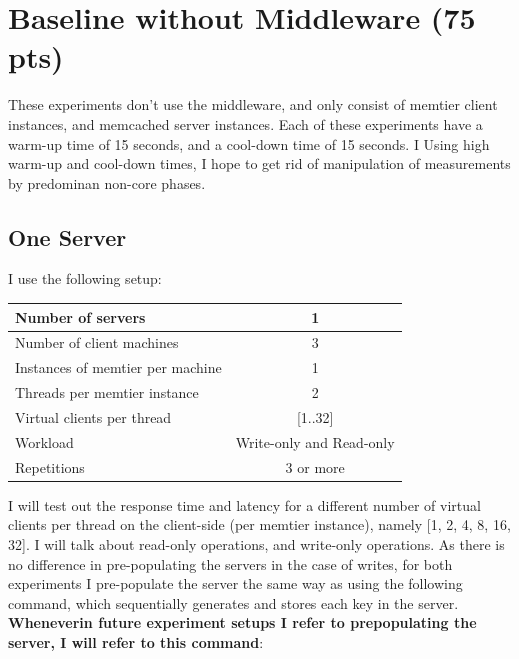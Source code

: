 \documentclass[11pt,a4paper]{article}
\begin{document}
\newpage

\section{Baseline without Middleware (75 pts)}
These experiments don't use the middleware, and only consist of memtier client instances, and memcached server instances.
Each of these experiments have a warm-up time of 15 seconds, and a cool-down time of 15 seconds.
I Using high warm-up and cool-down times, I hope to get rid of manipulation of measurements by predominan non-core phases.

\subsection{One Server}

I use the following setup:

\begin{center}
	\scriptsize{
		\begin{tabular}{|l|c|}
			\hline Number of servers                & 1                        \\ 
			\hline Number of client machines        & 3                        \\ 
			\hline Instances of memtier per machine & 1                        \\ 
			\hline Threads per memtier instance     & 2                        \\
			\hline Virtual clients per thread       & [1..32]                  \\ 
			\hline Workload                         & Write-only and Read-only \\
			\hline Repetitions                      & 3 or more                \\ 
			\hline 
		\end{tabular}
	} 
\end{center}

I will test out the response time and latency for a different number of virtual clients per thread on the client-side (per memtier instance), namely [1, 2, 4, 8, 16, 32].
I will talk about read-only operations, and write-only operations.
As there is no difference in pre-populating the servers in the case of writes, for both experiments I pre-populate the server the same way as using the following command, which sequentially generates and stores each key in the server.
\textbf{Wheneverin future experiment setups  I refer to prepopulating the server, I will refer to this command}:
\end{document}
